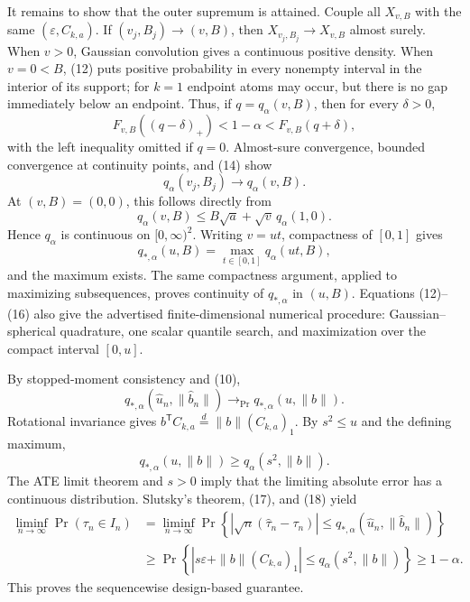 It remains to show that the outer supremum is attained.  Couple all \(X_{v,B}\) with the same \((\varepsilon,C_{k,a})\).  If \((v_j,B_j)\to(v,B)\), then \(X_{v_j,B_j}\to X_{v,B}\) almost surely.  When \(v>0\), Gaussian convolution gives a continuous positive density.  When \(v=0<B\), (12) puts positive probability in every nonempty interval in the interior of its support; for \(k=1\) endpoint atoms may occur, but there is no gap immediately below an endpoint.  Thus, if \(q=q_\alpha(v,B)\), then for every \(\delta>0\),
\[
 F_{v,B}((q-\delta)_+)<1-\alpha<F_{v,B}(q+\delta), \tag{14}
\]
with the left inequality omitted if \(q=0\).  Almost-sure convergence, bounded convergence at continuity points, and (14) show
\[
 q_\alpha(v_j,B_j)\longrightarrow q_\alpha(v,B). \tag{15}
\]
At \((v,B)=(0,0)\), this follows directly from
\[
 q_\alpha(v,B)\le B\sqrt a+\sqrt v\,q_\alpha(1,0).
\]
Hence \(q_\alpha\) is continuous on \([0,\infty)^2\).  Writing \(v=ut\), compactness of \([0,1]\) gives
\[
 q_{*,\alpha}(u,B)=\max_{t\in[0,1]}q_\alpha(ut,B), \tag{16}
\]
and the maximum exists.  The same compactness argument, applied to maximizing subsequences, proves continuity of \(q_{*,\alpha}\) in \((u,B)\).  Equations (12)--(16) also give the advertised finite-dimensional numerical procedure: Gaussian--spherical quadrature, one scalar quantile search, and maximization over the compact interval \([0,u]\).

By stopped-moment consistency and (10),
\[
 q_{*,\alpha}(\widehat u_n,\|\widehat b_n\|)
 \longrightarrow_{\Pr}q_{*,\alpha}(u,\|b\|). \tag{17}
\]
Rotational invariance gives
\(b^{\mathsf T}C_{k,a}\overset d=\|b\|(C_{k,a})_1\).  By \(s^2\le u\) and the defining maximum,
\[
 q_{*,\alpha}(u,\|b\|)\ge q_\alpha(s^2,\|b\|). \tag{18}
\]
The ATE limit theorem and \(s>0\) imply that the limiting absolute error has a continuous distribution.  Slutsky's theorem, (17), and (18) yield
\[
 \begin{aligned}
 \liminf_{n\to\infty}\Pr(\tau_n\in I_n)
 &=\liminf_{n\to\infty}\Pr\!\left\{
 |\sqrt n(\widehat\tau_n-\tau_n)|
 \le q_{*,\alpha}(\widehat u_n,\|\widehat b_n\|)\right\}\\
 &\ge \Pr\!\left\{|s\varepsilon+\|b\|(C_{k,a})_1|
 \le q_\alpha(s^2,\|b\|)\right\}\ge1-\alpha. \tag{19}
 \end{aligned}
\]
This proves the sequencewise design-based guarantee.

